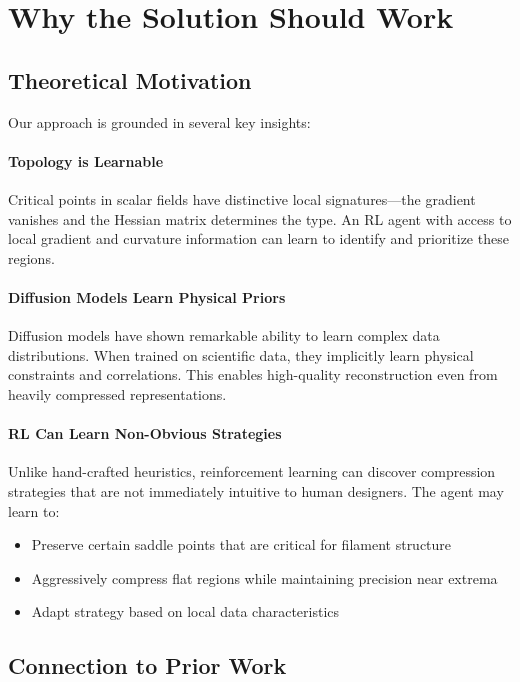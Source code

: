 \section{Why the Solution Should Work}
\label{sec:justification}


\subsection{Theoretical Motivation}

Our approach is grounded in several key insights:

\paragraph{Topology is Learnable}
Critical points in scalar fields have distinctive local signatures---the gradient vanishes and the Hessian matrix determines the type. An RL agent with access to local gradient and curvature information can learn to identify and prioritize these regions.

\paragraph{Diffusion Models Learn Physical Priors}
Diffusion models have shown remarkable ability to learn complex data distributions. When trained on scientific data, they implicitly learn physical constraints and correlations. This enables high-quality reconstruction even from heavily compressed representations.

\paragraph{RL Can Learn Non-Obvious Strategies}
Unlike hand-crafted heuristics, reinforcement learning can discover compression strategies that are not immediately intuitive to human designers. The agent may learn to:
\begin{itemize}
    \item Preserve certain saddle points that are critical for filament structure
    \item Aggressively compress flat regions while maintaining precision near extrema
    \item Adapt strategy based on local data characteristics
\end{itemize}

\subsection{Connection to Prior Work}

